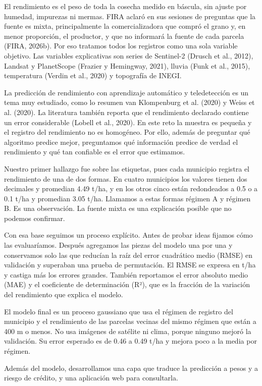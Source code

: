 \documentclass[11pt,letterpaper]{article}
\begin{document}
El rendimiento es el peso de toda la cosecha medido en báscula, sin ajuste por humedad, impurezas ni mermas. FIRA aclaró en sus sesiones de preguntas que la fuente es mixta, principalmente la comercializadora que compró el grano y, en menor proporción, el productor, y que no informará la fuente de cada parcela (FIRA, 2026b). Por eso tratamos todos los registros como una sola variable objetivo. Las variables explicativas son series de Sentinel-2 (Drusch et al., 2012), Landsat y PlanetScope (Frazier y Hemingway, 2021), lluvia (Funk et al., 2015), temperatura (Verdin et al., 2020) y topografía de INEGI.

La predicción de rendimiento con aprendizaje automático y teledetección es un tema muy estudiado, como lo resumen van Klompenburg et al. (2020) y Weiss et al. (2020). La literatura también reporta que el rendimiento declarado contiene un error considerable (Lobell et al., 2020). En este reto la muestra es pequeña y el registro del rendimiento no es homogéneo. Por ello, además de preguntar qué algoritmo predice mejor, preguntamos qué información predice de verdad el rendimiento y qué tan confiable es el error que estimamos.

Nuestro primer hallazgo fue sobre las etiquetas, pues cada municipio registra el rendimiento de una de dos formas. En cuatro municipios los valores tienen dos decimales y promedian 4.49 t/ha, y en los otros cinco están redondeados a 0.5 o a 0.1 t/ha y promedian 3.05 t/ha. Llamamos a estas formas régimen A y régimen B. Es una observación. La fuente mixta es una explicación posible que no podemos confirmar.

Con esa base seguimos un proceso explícito. Antes de probar ideas fijamos cómo las evaluaríamos. Después agregamos las piezas del modelo una por una y conservamos solo las que reducían la raíz del error cuadrático medio (RMSE) en validación y superaban una prueba de permutación. El RMSE se expresa en t/ha y castiga más los errores grandes. También reportamos el error absoluto medio (MAE) y el coeficiente de determinación (R²), que es la fracción de la variación del rendimiento que explica el modelo.

El modelo final es un proceso gaussiano que usa el régimen de registro del municipio y el rendimiento de las parcelas vecinas del mismo régimen que están a 400 m o menos. No usa imágenes de satélite ni clima, porque ninguno mejoró la validación. Su error esperado es de 0.46 a 0.49 t/ha y mejora poco a la media por régimen.

Además del modelo, desarrollamos una capa que traduce la predicción a pesos y a riesgo de crédito, y una aplicación web para consultarla.
\end{document}

